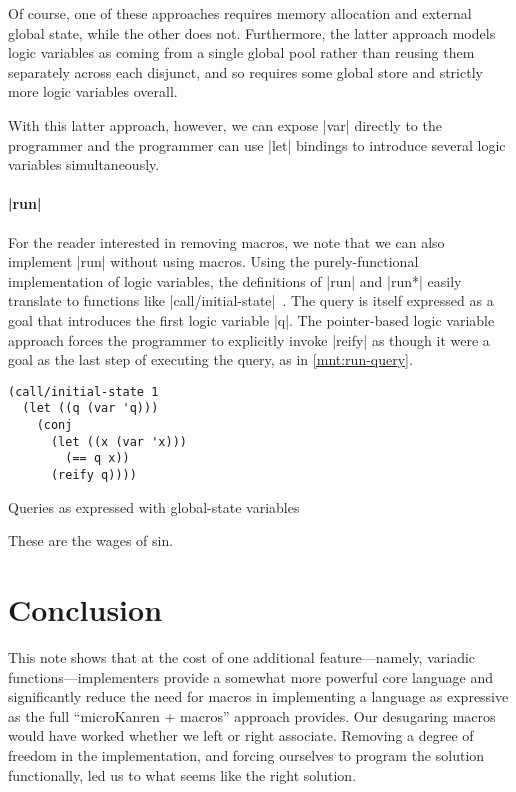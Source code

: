 \documentclass[sigplan,draft,natbib=false]{acmart}
\begin{document}
Of course, one of these approaches requires memory allocation and
external global state, while the other does not. Furthermore, the
latter approach models logic variables as coming from a single global
pool rather than reusing them separately across each disjunct, and so
requires some global store and strictly more logic variables overall.

With this latter approach, however, we can expose \rackinline|var|
directly to the programmer and the programmer can use \rackinline|let|
bindings to introduce several logic variables simultaneously.

\paragraph{\rackinline|run|}

For the reader interested in removing macros, we note that we can also
implement \rackinline|run| without using macros. Using the
purely-functional implementation of logic variables, the definitions
of \rackinline|run| and \rackinline|run*| easily translate to
functions like
\rackinline|call/initial-state|~\cite{hemann2013muKanren}. The query
is itself expressed as a goal that introduces the first logic variable
\rackinline|q|. The pointer-based logic variable approach forces the
programmer to explicitly invoke \rackinline|reify| as though it were a
goal as the last step of executing the query, as in
\cref{mnt:run-query}.

\begin{listing}
  \begin{verbatim}
(call/initial-state 1
  (let ((q (var 'q)))
    (conj
      (let ((x (var 'x)))
        (== q x))
      (reify q))))
  \end{verbatim}
  \caption{Queries as expressed with global-state variables}
  \label{mnt:run-query}
\end{listing}

These are the wages of sin.

\section{Conclusion}\label{sec:conclusion}

This note shows that at the cost of one additional feature---namely,
variadic functions---implementers provide a somewhat more powerful
core language and significantly reduce the need for macros in
implementing a language as expressive as the full \enquote{microKanren
  + macros} approach provides. Our desugaring macros would have worked
whether we left or right associate. Removing a degree of freedom in
the implementation, and forcing ourselves to program the solution
functionally, led us to what seems like the right solution.
\end{document}
